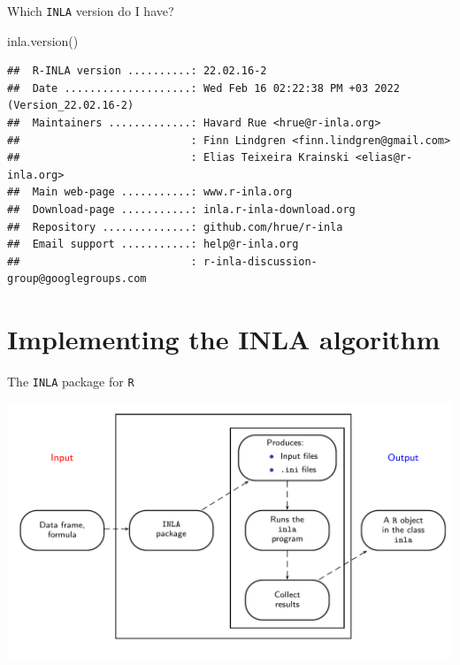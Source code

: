 \documentclass[
  ignorenonframetext,
]{beamer}
\newenvironment{Shaded}{\begin{snugshade}}{\end{snugshade}}
\newcommand{\FunctionTok}[1]{\textcolor[rgb]{0.00,0.00,0.00}{#1}}
\newcommand{\NormalTok}[1]{#1}
\begin{document}
\begin{frame}[fragile]{Which \texttt{INLA} version do I have?}
\protect\hypertarget{which-inla-version-do-i-have}{}
\begin{Shaded}
\begin{Highlighting}[]
\FunctionTok{inla.version}\NormalTok{()}
\end{Highlighting}
\end{Shaded}

\begin{verbatim}
##  R-INLA version ..........: 22.02.16-2
##  Date ....................: Wed Feb 16 02:22:38 PM +03 2022 (Version_22.02.16-2)
##  Maintainers .............: Havard Rue <hrue@r-inla.org>
##                           : Finn Lindgren <finn.lindgren@gmail.com>
##                           : Elias Teixeira Krainski <elias@r-inla.org>
##  Main web-page ...........: www.r-inla.org
##  Download-page ...........: inla.r-inla-download.org
##  Repository ..............: github.com/hrue/r-inla
##  Email support ...........: help@r-inla.org
##                           : r-inla-discussion-group@googlegroups.com
\end{verbatim}
\end{frame}

\hypertarget{implementing-the-inla-algorithm}{%
\section{Implementing the INLA
algorithm}\label{implementing-the-inla-algorithm}}

\begin{frame}{The \texttt{INLA} package for \texttt{R}}
\protect\hypertarget{the-inla-package-for-r}{}
\begin{center}\includegraphics[width=1\linewidth]{graphics/inla-structure} \end{center}
\end{frame}
\end{document}
